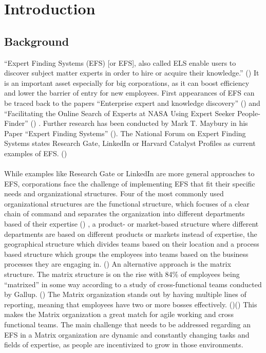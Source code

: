 \newpage
\section{Introduction}

\subsection{Background}
“Expert Finding Systems (EFS) [or \ac{EFS}], also called \ac{ELS} enable users to discover subject matter experts in order to hire or acquire their 
knowledge.” (\cite[page vii]{maybury_expert_2006}) It is an important asset especially for big corporations, as it can boost efficiency and lower the barrier of 
entry for new employees. First appearances of \ac{EFS} can be traced back to the papers “Enterprise expert and knowledge discovery” (\cite{mattox_enterprise_1999}) and 
“Facilitating the Online Search of Experts at NASA Using Expert Seeker People-Finder” (\cite{becerra-fernandez_facilitating_nodate}) . Further research has been 
conducted by Mark T. Maybury in his Paper “Expert Finding Systems” (\cite{maybury_expert_2006}). The National Forum on Expert Finding Systems states Research 
Gate, LinkedIn or Harvard Catalyst Profiles as current examples of \ac{EFS}. (\cite{noauthor_national_nodate})
\\ \\
While examples like Research Gate or LinkedIn are more 
general approaches to \ac{EFS}, corporations face the challenge of implementing \ac{EFS} that fit their specific needs and organizational structures.
Four of the most commonly used organizational structures are the functional structure, which focuses of a clear chain of command and separates the organization 
into different departments based of their expertise (\cite{noauthor_what_nodate-1}) , a product- or market-based structure where different departments are based on 
different products or markets instead of expertise, the geographical structure which divides teams based on their location and a process based structure which 
groups the employees into teams based on the business processes they are engaging in. (\cite{organ_7_2023})   
An alternative approach is the matrix structure. The matrix structure is on the rise with 84\% of employees being “matrixed” in some way according to a study of 
cross-functional teams conducted by Gallup. (\cite[page 65]{inc_state_nodate}) The Matrix organization stands out by having multiple lines of reporting, meaning 
that employees have two or more bosses effectively. (\cite{noauthor_what_nodate})(\cite{organ_7_2023}) This makes the Matrix organization a great match for agile working and cross functional teams. The main challenge that needs to be addressed regarding an \ac{EFS} in a Matrix organization are dynamic and constantly changing tasks and fields of expertise, as people are incentivized to grow in those environments.
